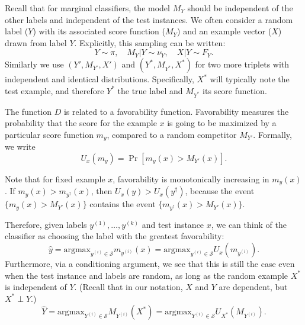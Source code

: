 \documentclass[twoside,11pt]{article}
\newcommand{\argmax}{\text{argmax}}
\begin{document}
Recall that for marginal classifiers, the model $M_Y$ should be independent of the other labels and independent of the test instances.
We often consider a random label ($Y$) with
its associated score function ($M_Y$) and an example vector ($X$) drawn from label $Y$. Explicitly, this
sampling can be written: %
\[Y \sim \pi,\quad M_{Y}|Y \sim \nu_{Y},\quad X|Y \sim F_{Y}. \]
Similarly we use $(Y',M_{Y'},X')$ and $(Y^*,M_{Y^*},X^*)$ for two more
triplets with independent and identical distributions. Specifically,
$X^*$ will typically note the test example, and therefore $Y^*$ the
true label and $M_{Y^*}$ its score function.

The function ${D}$ is related to a favorability
function. Favorability measures the probability that the score for the
example $x$ is going to be maximized by a particular score function $m_y$,
compared to a random competitor $M_{Y'}$. %
Formally, we write
\begin{equation}\label{eq:U_function}
U_{x}(m_{y}) = \Pr[m_{y}(x) > M_{Y'}(x)].
\end{equation}

Note that for fixed example $x$, favorability is monotonically
increasing in $m_{y}(x)$.  If $m_y(x) > m_{y^\dagger}(x)$, then
$U_{x}(y) > U_{x}(y^\dagger)$, because the event $\{m_{y}(x) >
M_{Y'}(x)\}$ contains the event $\{m_{y^\dagger}(x) >
M_{Y'}(x)\}$.

Therefore, given labels $y^{(1)},\hdots,y^{(k)}$ and test instance
$x$, we can think of the classifier as choosing the label with the
greatest favorability:
\[
\hat{y} = \argmax_{y^{(i)} \in \mathcal{S}} m_{y^{(i)}}(x) = \argmax_{y^{(i)} \in \mathcal{S}} U_{x}(m_{y^{(i)}}).
\]
Furthermore, via a conditioning argument, we see that this is still
the case even when the test instance and labels are random,
as long as the random example $X^*$ is independent of $Y$.
(Recall that in our notation, $X$ and $Y$ are dependent, but $X^* \perp Y$.)
\[
\hat{Y} = \argmax_{Y^{(i)} \in \mathcal{S}} M_{Y^{(i)}}(X^*) = \argmax_{Y^{(i)} \in \mathcal{S}} U_{X^*}(M_{Y^{(i)}}).
\]

\end{document}
